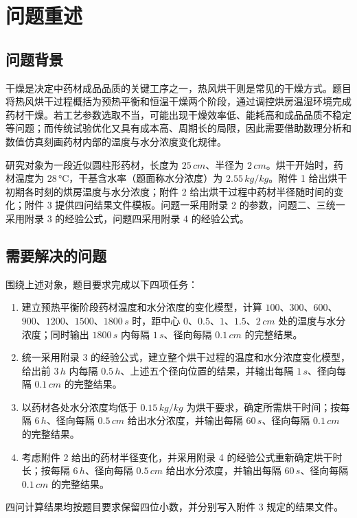 \documentclass[withoutpreface,bwprint]{cumcmthesis}
\title{\titleemphasis{药材烘干过程的传热传质建模}}
\begin{document}
\maketitle
\begin{abstract}
\end{abstract}

\section{问题重述}

\subsection{问题背景}

干燥是决定中药材成品品质的关键工序之一，热风烘干则是常见的干燥方式。题目将热风烘干过程概括为预热平衡和恒温干燥两个阶段，通过调控烘房温湿环境完成药材干燥。若工艺参数选取不当，可能出现干燥效率低、能耗高和成品品质不稳定等问题；而传统试验优化又具有成本高、周期长的局限，因此需要借助数理分析和数值仿真刻画药材内部的温度与水分浓度变化规律。

研究对象为一段近似圆柱形药材，长度为 $25\,\si{cm}$、半径为 $2\,\si{cm}$。烘干开始时，药材温度为 $28\,\si{\celsius}$，干基含水率（题面称水分浓度）为 $2.55\,\si{kg/kg}$。附件 1 给出烘干初期各时刻的烘房温度与水分浓度；附件 2 给出烘干过程中药材半径随时间的变化；附件 3 提供四问结果文件模板。问题一采用附录 2 的参数，问题二、三统一采用附录 3 的经验公式，问题四采用附录 4 的经验公式。

\subsection{需要解决的问题}

围绕上述对象，题目要求完成以下四项任务：
\begin{enumerate}
  \item 建立预热平衡阶段药材温度和水分浓度的变化模型，计算 $100$、$300$、$600$、$900$、$1200$、$1500$、$1800\,\si{s}$ 时，距中心 $0$、$0.5$、$1$、$1.5$、$2\,\si{cm}$ 处的温度与水分浓度；同时输出 $1800\,\si{s}$ 内每隔 $1\,\si{s}$、径向每隔 $0.1\,\si{cm}$ 的完整结果。
  \item 统一采用附录 3 的经验公式，建立整个烘干过程的温度和水分浓度变化模型，给出前 $3\,\si{h}$ 内每隔 $0.5\,\si{h}$、上述五个径向位置的结果，并输出每隔 $1\,\si{s}$、径向每隔 $0.1\,\si{cm}$ 的完整结果。
  \item 以药材各处水分浓度均低于 $0.15\,\si{kg/kg}$ 为烘干要求，确定所需烘干时间；按每隔 $6\,\si{h}$、径向每隔 $0.5\,\si{cm}$ 给出水分浓度，并输出每隔 $60\,\si{s}$、径向每隔 $0.1\,\si{cm}$ 的完整结果。
  \item 考虑附件 2 给出的药材半径变化，并采用附录 4 的经验公式重新确定烘干时长；按每隔 $6\,\si{h}$、径向每隔 $0.5\,\si{cm}$ 给出水分浓度，并输出每隔 $60\,\si{s}$、径向每隔 $0.1\,\si{cm}$ 的完整结果。
\end{enumerate}
四问计算结果均按题目要求保留四位小数，并分别写入附件 3 规定的结果文件。
\end{document}

